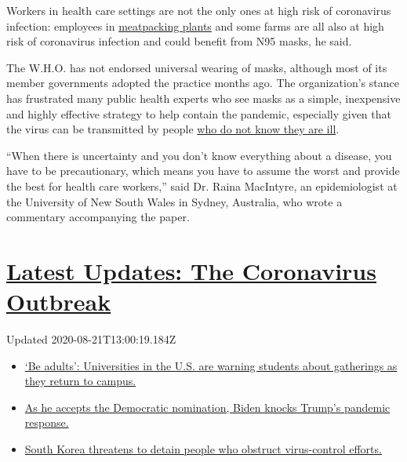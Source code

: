 Workers in health care settings are not the only ones at high risk of
coronavirus infection: employees in
\href{https://www.nytimes3xbfgragh.onion/2020/05/25/business/coronavirus-meatpacking-plants-cases.html}{meatpacking
plants} and some farms are all also at high risk of coronavirus
infection and could benefit from N95 masks, he said.

The W.H.O. has not endorsed universal wearing of masks, although most of
its member governments adopted the practice months ago. The
organization's stance has frustrated many public health experts who see
masks as a simple, inexpensive and highly effective strategy to help
contain the pandemic, especially given that the virus can be transmitted
by people
\href{https://www.nytimes3xbfgragh.onion/2020/03/31/health/coronavirus-asymptomatic-transmission.html}{who
do not know they are ill}.

``When there is uncertainty and you don't know everything about a
disease, you have to be precautionary, which means you have to assume
the worst and provide the best for health care workers,'' said Dr. Raina
MacIntyre, an epidemiologist at the University of New South Wales in
Sydney, Australia, who wrote a commentary accompanying the paper.

\hypertarget{latest-updates-the-coronavirus-outbreak}{%
\section{\texorpdfstring{\href{https://www.nytimes3xbfgragh.onion/2020/08/21/world/covid-19-coronavirus.html?action=click\&pgtype=Article\&state=default\&region=MAIN_CONTENT_1\&context=storylines_live_updates}{Latest
Updates: The Coronavirus
Outbreak}}{Latest Updates: The Coronavirus Outbreak}}\label{latest-updates-the-coronavirus-outbreak}}

Updated 2020-08-21T13:00:19.184Z

\begin{itemize}
\tightlist
\item
  \href{https://www.nytimes3xbfgragh.onion/2020/08/21/world/covid-19-coronavirus.html?action=click\&pgtype=Article\&state=default\&region=MAIN_CONTENT_1\&context=storylines_live_updates\#link-6a60a19d}{`Be
  adults': Universities in the U.S. are warning students about
  gatherings as they return to campus.}
\item
  \href{https://www.nytimes3xbfgragh.onion/2020/08/21/world/covid-19-coronavirus.html?action=click\&pgtype=Article\&state=default\&region=MAIN_CONTENT_1\&context=storylines_live_updates\#link-324af071}{As
  he accepts the Democratic nomination, Biden knocks Trump's pandemic
  response.}
\item
  \href{https://www.nytimes3xbfgragh.onion/2020/08/21/world/covid-19-coronavirus.html?action=click\&pgtype=Article\&state=default\&region=MAIN_CONTENT_1\&context=storylines_live_updates\#link-191d44be}{South
  Korea threatens to detain people who obstruct virus-control efforts.}
\end{itemize}

